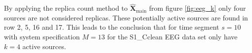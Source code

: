 By applying the replica count method to $\hat{\mathbf{X}}_{\text{main}}$  from figure \ref{fig:eeg_k} only four sources are not considered replicas. 
These potentially active sources are found in row 2, 5, 16 and 17. 
This leads to the conclusion that for time segment $s = 10$ with system specification $M = 13$ for the S1\_Cclean EEG data set only have $k = 4$ active sources. 



